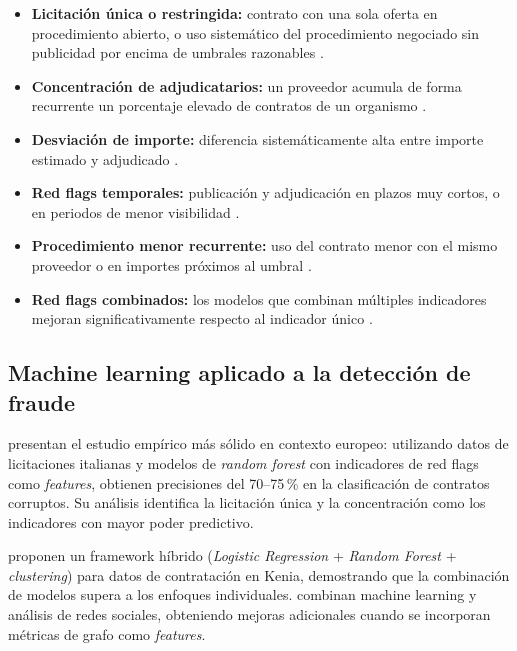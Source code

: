 \documentclass[11pt,a4paper,spanish]{book}
\numberwithin{equation}{chapter}
\numberwithin{figure}{chapter}
\begin{document}
\begin{itemize}
  \item \textbf{Licitaci{\'o}n {\'u}nica o restringida:} contrato con una sola oferta en procedimiento abierto, o uso sistem{\'a}tico del procedimiento negociado sin publicidad por encima de umbrales razonables \cite{OCP2016RedFlags}.
  \item \textbf{Concentraci{\'o}n de adjudicatarios:} un proveedor acumula de forma recurrente un porcentaje elevado de contratos de un organismo \cite{Fazekas2020DIGIWHIST}.
  \item \textbf{Desviaci{\'o}n de importe:} diferencia sistem{\'a}ticamente alta entre importe estimado y adjudicado \cite{Coviello2023Italian}.
  \item \textbf{Red flags temporales:} publicaci{\'o}n y adjudicaci{\'o}n en plazos muy cortos, o en periodos de menor visibilidad \cite{OCP2024RedFlags}.
  \item \textbf{Procedimiento menor recurrente:} uso del contrato menor con el mismo proveedor o en importes pr{\'o}ximos al umbral \cite{OIReScon2025}.
  \item \textbf{Red flags combinados:} los modelos que combinan m{\'u}ltiples indicadores mejoran significativamente respecto al indicador {\'u}nico \cite{Wachs2025ML}.
\end{itemize}

\subsection{Machine learning aplicado a la detecci{\'o}n de fraude}

 presentan el estudio emp{\'i}rico m{\'a}s s{\'o}lido en contexto europeo: utilizando datos de licitaciones italianas y modelos de \textit{random forest} con indicadores de red flags como \textit{features}, obtienen precisiones del 70--75\,\% en la clasificaci{\'o}n de contratos corruptos. Su an{\'a}lisis identifica la licitaci{\'o}n {\'u}nica y la concentraci{\'o}n como los indicadores con mayor poder predictivo.

 proponen un framework h{\'i}brido (\textit{Logistic Regression} + \textit{Random Forest} + \textit{clustering}) para datos de contrataci{\'o}n en Kenia, demostrando que la combinaci{\'o}n de modelos supera a los enfoques individuales.  combinan machine learning y an{\'a}lisis de redes sociales, obteniendo mejoras adicionales cuando se incorporan m{\'e}tricas de grafo como \textit{features}.
\end{document}
